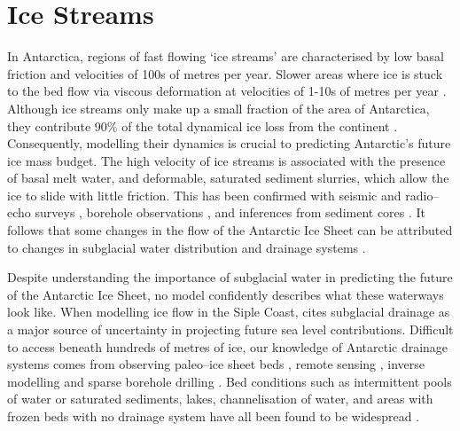 


\section{Ice Streams} \label{sec:ice_streams}

In Antarctica, regions of fast flowing `ice streams'  are characterised by low basal friction and velocities of 100s of metres per year. Slower areas where ice is stuck to the bed flow via viscous deformation at velocities of 1-10s of metres per year \citep{rignot2011ice, morlighem2013inversion}.
Although ice streams only make up a small fraction of the area of  Antarctica, they contribute 90\% of the total dynamical ice loss from the continent \citep{bamber2000widespread, rignot2011ice}.  Consequently, modelling their dynamics is crucial to predicting Antarctic's future ice mass budget. The high velocity of ice streams is associated with the presence of basal melt water, and deformable, saturated sediment slurries, which allow the ice to slide with little friction. This has been confirmed with seismic \citep{blankenship1986seismic, alley1987till} and radio--echo surveys \citep{robin1970radio}, borehole observations  \citep{engelhardt1997basal}, and inferences from sediment cores \citep{hodson2016physical}.
It follows that some changes in the flow of the Antarctic Ice Sheet can be attributed to changes in subglacial water distribution and drainage systems \citep[e.g.][]{alley1994water}.

Despite understanding the importance of subglacial water in predicting the future of the Antarctic Ice Sheet, no model confidently describes what these waterways look like. When modelling ice flow in the Siple Coast, \cite{bougamont2015reactivation} cites subglacial drainage as a major source of uncertainty in projecting future sea level contributions.
Difficult to access beneath hundreds of metres of ice, our  knowledge of Antarctic drainage systems comes from observing paleo--ice sheet beds \citep{hattestrand1997ribbed, lewis2006age}, remote sensing \citep{schroeder2013evidence}, inverse modelling \citep{morlighem2013inversion} and sparse borehole drilling \citep{engelhardt1997basal}.
Bed conditions such as intermittent pools of water or saturated
sediments, lakes, channelisation of water, and areas with frozen beds with no drainage system have all been found to be widespread \citep{carter2009using, schroeder2013evidence, young2016distribution}. 

